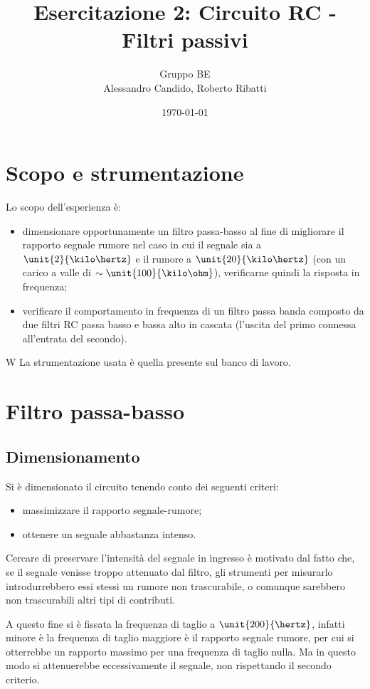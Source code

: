 \documentclass[10pt,a4paper]{article}
\title{Esercitazione 2: Circuito RC - Filtri passivi}
\author{Gruppo BE \\ Alessandro Candido, Roberto Ribatti}
\date{\today}
\begin{document}
\maketitle

\section{Scopo e strumentazione}
Lo scopo dell'esperienza è:
\begin{itemize}
\item dimensionare opportunamente un filtro passa-basso al fine di migliorare il rapporto segnale rumore nel caso in cui il segnale sia a $\unit{2}{\kilo\hertz}$ e il rumore a $\unit{20}{\kilo\hertz}$ (con un carico a valle di $\sim \unit{100}{\kilo\ohm}$), verificarne quindi la risposta in frequenza;
\item verificare il comportamento in frequenza di un filtro passa banda composto da due filtri RC passa basso e bassa alto in cascata (l'uscita del primo connessa all'entrata del secondo).
\end{itemize}
W
La strumentazione usata è quella presente sul banco di lavoro.

\section{Filtro passa-basso}

\subsection{Dimensionamento}
Si è dimensionato il circuito tenendo conto dei seguenti criteri:
\begin{itemize}
\item massimizzare il rapporto segnale-rumore;
\item ottenere un segnale abbastanza intenso.
\end{itemize}
Cercare di preservare l'intensità del segnale in ingresso è motivato dal fatto che, se il segnale venisse troppo attenuato dal filtro, gli strumenti per misurarlo introdurrebbero essi stessi un rumore non trascurabile, o comunque sarebbero non trascurabili altri tipi di contributi.

A questo fine si è fissata la frequenza di taglio a $\unit{200}{\hertz}$, infatti minore è la frequenza di taglio maggiore è il rapporto segnale rumore, per cui si otterrebbe un rapporto massimo per una frequenza di taglio nulla. Ma in questo modo si attenuerebbe eccessivamente il segnale, non rispettando il secondo criterio.
\end{document}
